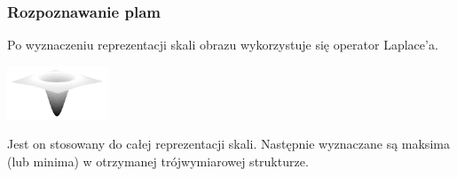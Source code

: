 \begin{frame}
\frametitle{Rozpoznawanie plam}

Po wyznaczeniu reprezentacji skali obrazu wykorzystuje się operator Laplace'a.
\begin{center}
\includegraphics[width=3cm]{laplacian.png}
\end{center}
Jest on stosowany do całej reprezentacji skali. Następnie wyznaczane są maksima (lub minima) w otrzymanej trójwymiarowej strukturze.

\end{frame}
